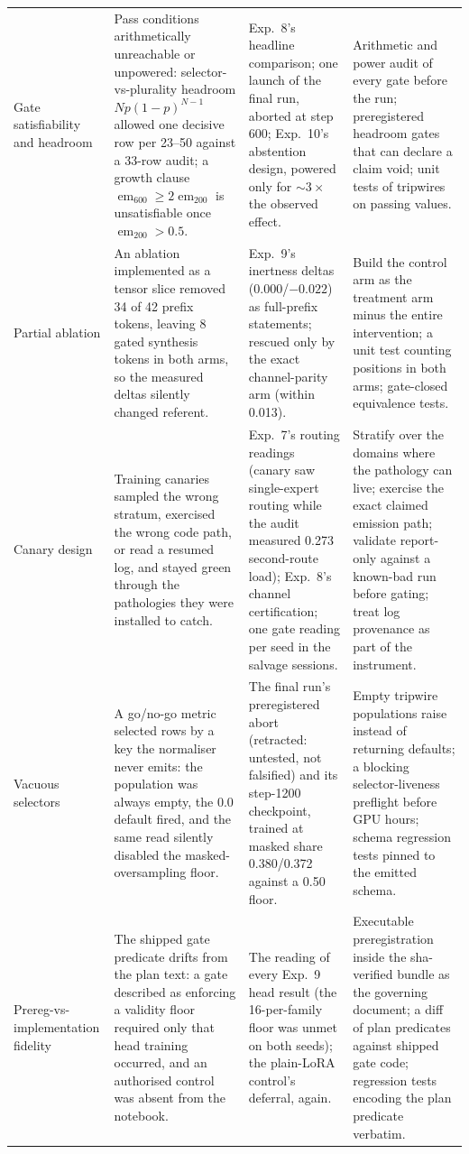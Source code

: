 \documentclass[10pt,a4paper]{article}
\newcommand{\op}[1]{\operatorname{#1}}
\newcommand{\fail}[1]{\textcolor{failred}{#1}}
\begin{document}
\begin{table}[htbp]
\begin{tabularx}{\textwidth}{@{}>{\raggedright\arraybackslash}p{1.7cm}>{\raggedright\arraybackslash}X>{\raggedright\arraybackslash}X>{\raggedright\arraybackslash}X@{}}
\addlinespace
Gate satisfiability and headroom & Pass conditions arithmetically unreachable or unpowered: selector-vs-plurality headroom $Np(1-p)^{N-1}$ allowed one decisive row per 23--50 against a 33-row audit; a growth clause $\op{em}_{600}\ge 2\op{em}_{200}$ is unsatisfiable once $\op{em}_{200}>0.5$. & Exp.~8's headline comparison; one launch of the final run, aborted at step 600; Exp.~10's abstention design, powered only for ${\sim}3\times$ the observed effect. & Arithmetic and power audit of every gate before the run; preregistered headroom gates that can declare a claim void; unit tests of tripwires on passing values. \\
\addlinespace
Partial ablation & An ablation implemented as a tensor slice removed 34 of 42 prefix tokens, leaving 8 gated synthesis tokens in both arms, so the measured deltas silently changed referent. & Exp.~9's inertness deltas ($0.000$/$-0.022$) as full-prefix statements; rescued only by the exact channel-parity arm (within 0.013). & Build the control arm as the treatment arm minus the entire intervention; a unit test counting positions in both arms; gate-closed equivalence tests. \\
\addlinespace
Canary design & Training canaries sampled the wrong stratum, exercised the wrong code path, or read a resumed log, and stayed green through the pathologies they were installed to catch. & Exp.~7's routing readings (canary saw single-expert routing while the audit measured 0.273 second-route load); Exp.~8's channel certification; one gate reading per seed in the salvage sessions. & Stratify over the domains where the pathology can live; exercise the exact claimed emission path; validate report-only against a known-bad run before gating; treat log provenance as part of the instrument. \\
\addlinespace
Vacuous selectors & A go/no-go metric selected rows by a key the normaliser never emits: the population was always empty, the 0.0 default fired, and the same read silently disabled the masked-oversampling floor. & The final run's preregistered abort (retracted: untested, not falsified) and its step-1200 checkpoint, trained at masked share \fail{0.380/0.372} against a 0.50 floor. & Empty tripwire populations raise instead of returning defaults; a blocking selector-liveness preflight before GPU hours; schema regression tests pinned to the emitted schema. \\
\addlinespace
Prereg-vs-imple\-mentation fidelity & The shipped gate predicate drifts from the plan text: a gate described as enforcing a validity floor required only that head training occurred, and an authorised control was absent from the notebook. & The reading of every Exp.~9 head result (the 16-per-family floor was unmet on both seeds); the plain-LoRA control's deferral, again. & Executable preregistration inside the sha-verified bundle as the governing document; a diff of plan predicates against shipped gate code; regression tests encoding the plan predicate verbatim. \\

\end{tabularx}
\end{table}
\end{document}
